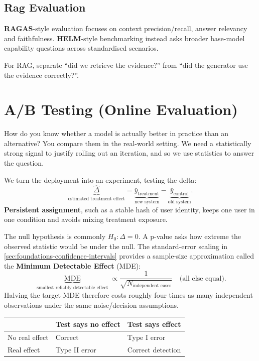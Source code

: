\subsection{Rag Evaluation}
\textbf{RAGAS}-style evaluation focuses on context precision/recall, answer relevancy and faithfulness.
\textbf{HELM}-style benchmarking instead asks broader base-model capability questions across standardised scenarios.

\begin{calloutmemoryhook}
    For RAG, separate ``did we retrieve the evidence?'' from ``did the generator use the evidence correctly?''.
\end{calloutmemoryhook}

\section{A/B Testing (Online Evaluation)}
\label{sec:evaluation-online-experiments-and-ab-testing}
How do you know whether a model is actually better in practice than an alternative?
You compare them in the real-world setting. 
We need a statistically strong signal to justify rolling out an iteration, and so we use statistics to answer the question.

We turn the deployment into an experiment, testing the delta:
\[
    \underbrace{\widehat{\Delta}}_{\text{estimated treatment effect}}
    =
    \underbrace{\bar y_{\text{treatment}}}_{\text{new system}}
    -
    \underbrace{\bar y_{\text{control}}}_{\text{old system}}.
\]
\textbf{Persistent assignment}, such as a stable hash of user identity, keeps one user in one condition and avoids mixing treatment exposure.

The null hypothesis is commonly $H_0:\Delta=0$.
A p-value asks how extreme the observed statistic would be under the null.
The standard-error scaling in \cref{sec:foundations-confidence-intervals} provides a sample-size approximation called the \textbf{Minimum Detectable Effect} (MDE):
\[
    \underbrace{\operatorname{MDE}}_{\text{smallest reliably detectable effect}}
    \propto
    \frac{1}{\sqrt{N_{\text{independent cases}}}}
    \quad\text{(all else equal)}.
\]
Halving the target MDE therefore costs roughly four times as many independent observations under the same noise/decision assumptions.

\begin{center}
    \small
    \begin{tabularx}{.9\linewidth}{@{}L{.25\linewidth}YY@{}}
    \toprule
     & Test says no effect & Test says effect \\
    \midrule
    No real effect & Correct & Type I error \\
    Real effect & Type II error & Correct detection \\
    \bottomrule
    \end{tabularx}
\end{center}

